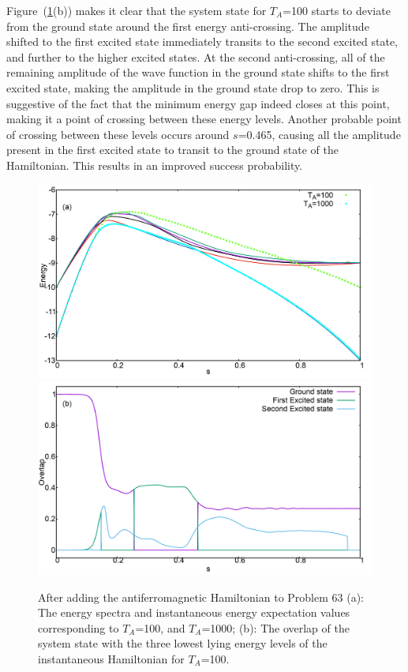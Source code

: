 \documentclass[../main.tex]{subfiles}
\begin{document}
Figure~(\ref{fig:a54}(b)) makes it clear that the system state for $T_A$=100 starts to deviate from the ground state around the first energy anti-crossing. The amplitude shifted to the first excited state immediately transits to the second excited state, and further to the higher excited states. At the second anti-crossing, all of the remaining amplitude of the wave function in the ground state shifts to the first excited state, making the amplitude in the ground state drop to zero. This is suggestive of the fact that the minimum energy gap indeed closes at this point, making it a point of crossing between these energy levels. Another probable point of crossing between these levels occurs around $s$=0.465, causing all the amplitude present in the first excited state to transit to the ground state of the Hamiltonian. This results in an improved success probability.
\begin{figure}
\centering
  \includegraphics[scale=0.24]{63_A_g2.png}  
\includegraphics[scale=0.24]{63_A_g2_Overlap.png}
  \caption{After adding the antiferromagnetic Hamiltonian to Problem 63 (a): The energy spectra and instantaneous energy expectation values corresponding to $T_A$=100, and $T_A$=1000; (b): The overlap of the system state with the three lowest lying energy levels of the instantaneous Hamiltonian for $T_A$=100.}
    \label{fig:a54}
 \end{figure}
\end{document}
